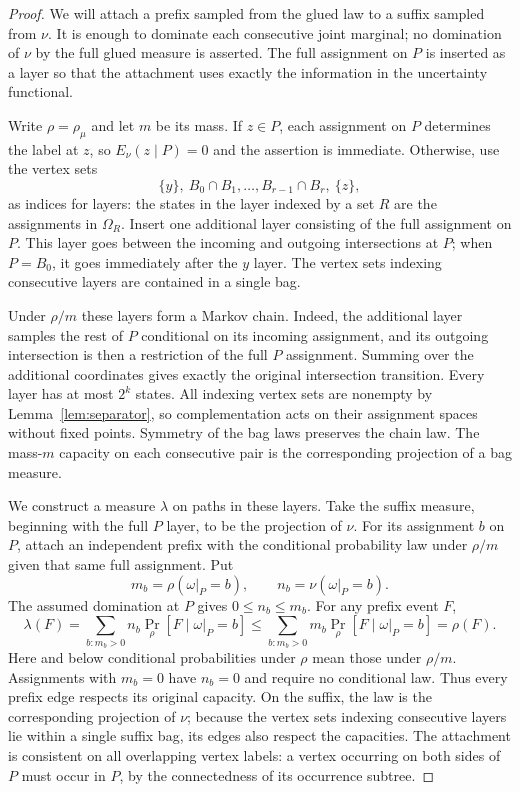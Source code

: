 \begin{proof}
We will attach a prefix sampled from the glued law to a suffix sampled
from $\nu$.  It is enough to dominate each consecutive joint marginal;
no domination of $\nu$ by the full glued measure is asserted.  The full
assignment on $P$ is inserted as a layer so that the attachment uses
exactly the information in the uncertainty functional.

Write $\rho=\rho_\mu$ and let $m$ be its mass.
If $z\in P$, each assignment on $P$ determines the label at $z$, so
$E_\nu(z\mid P)=0$ and the assertion is immediate.
Otherwise, use the vertex sets
\[
 \{y\},\ B_0\cap B_1,\ldots,B_{r-1}\cap B_r,\ \{z\},
\]
as indices for layers: the states in the layer indexed by a set $R$
are the assignments in $\Omega_R$. Insert one additional layer
consisting of the full assignment on $P$. This layer goes between the incoming and outgoing intersections
at $P$; when $P=B_0$, it goes immediately after the $y$ layer.
The vertex sets indexing consecutive layers are contained in a single bag.

Under $\rho/m$ these layers form a Markov chain.
Indeed, the additional layer samples the rest of $P$ conditional on its
incoming assignment, and its outgoing intersection is then a
restriction of the full $P$ assignment. Summing over the additional
coordinates gives exactly the original intersection transition.
Every layer has at most $2^k$ states.
All indexing vertex sets are nonempty by Lemma~\ref{lem:separator}, so
complementation acts on their assignment spaces without fixed points.
Symmetry of the bag laws preserves the chain law.
The mass-$m$ capacity on each consecutive pair is the corresponding
projection of a bag measure.

We construct a measure $\lambda$ on paths in these layers.
Take the suffix measure, beginning with the full $P$ layer, to be the
projection of $\nu$. For its assignment $b$ on $P$, attach an
independent prefix with the conditional probability law under
$\rho/m$ given that same full assignment.
Put
\[
 m_b=\rho(\omega|_P=b),\qquad n_b=\nu(\omega|_P=b).
\]
The assumed domination at $P$ gives $0\leq n_b\leq m_b$.
For any prefix event $F$,
\[
 \lambda(F)
 =\sum_{b:m_b>0}n_b\Pr_\rho[F\mid\omega|_P=b]
 \leq\sum_{b:m_b>0}m_b\Pr_\rho[F\mid\omega|_P=b]
 =\rho(F).
\]
Here and below conditional probabilities under $\rho$ mean those under
$\rho/m$. Assignments with $m_b=0$ have $n_b=0$ and require no
conditional law.
Thus every prefix edge respects its original capacity.
On the suffix, the law is the corresponding projection of $\nu$;
because the vertex sets indexing consecutive layers lie within a single suffix bag, its
edges also respect the capacities.
The attachment is consistent on all overlapping vertex labels: a
vertex occurring on both sides of $P$ must occur in $P$, by the
connectedness of its occurrence subtree.


\end{proof}
